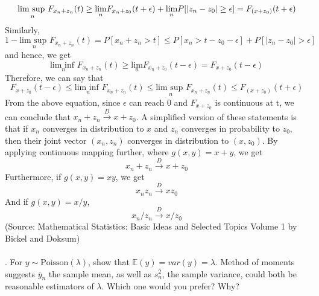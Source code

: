 \documentclass[11pt]{article}
\begin{document}
\begin{equation}
  \nonumber
  \underset{n}{\text{lim sup }}F_{x_{n} + z_{n}}(t) \geq \underset{n}{\text{lim}}F_{x_{n} + z_{0}}(t + \epsilon) + \underset{n}{\text{lim}}P[\lvert z_{n} - z_{0} \rvert \geq \epsilon] = F_{(x + z_{0})}(t + \epsilon)\\
\end{equation}Similarly,
\begin{equation}
  \nonumber
  1 - \underset{n}{\text{lim sup }}F_{x_{n} + z_{n}}(t) = P[x_{n} + z_{n} > t] \leq P[x_{n} > t - z_{0} -\epsilon] + P[\lvert z_{n} - z_{0} \rvert > \epsilon]
\end{equation}
and hence, we get
\begin{equation}
  \nonumber
  \underset{n}{\text{lim inf }}F_{x_{n} + z_{n}}(t) \geq \underset{n}{\text{lim}}F_{x_{n} + z_{0}}(t - \epsilon) = F_{x + z_{0}}(t - \epsilon)
\end{equation}
Therefore, we can say that
\begin{equation}
  \nonumber
  F_{x + z_{0}}(t - \epsilon) \leq \underset{n}{\text{lim inf }}F_{x_{n} + z_{n}}(t) \leq \underset{n}{\text{lim sup }}F_{x_{n} + z_{n}}(t) \leq F_{(x + z_{0})}(t + \epsilon)
\end{equation}
From the above equation, since $\epsilon$ can reach 0 and $F_{x + z_{0}}$ is continuous at t, we can conclude that $x_{n} + z_{n} \xrightarrow{D} x + z_{0}$. A simplified version of these statements is that if $x_{n}$ converges in distribution to $x$ and $z_{n}$ converges in probability to $z_{0}$, then their joint vector $(x_{n}, z_{n})$ converges in distribution to $(x, z_{0})$. By applying continuous mapping further, where $g(x, y) = x + y$, we get
\begin{equation}
  \nonumber
  x_{n} + z_{n} \xrightarrow{D} x + z_{0}
\end{equation}
Furthermore, if $g(x, y) = xy$, we get
\begin{equation}
  \nonumber
  x_{n}z_{n} \xrightarrow{D} xz_{0}
\end{equation}
And if $g(x, y) = x/y$,
\begin{equation}
  \nonumber
  x_{n}/z_{n} \xrightarrow{D} x/z_{0}
\end{equation}
(Source: Mathematical Statistics: Basic Ideas and Selected Topics Volume 1 by Bickel and Doksum)\\ \\
. For $y \sim \text{Poisson}(\lambda)$, show that $\mathbb{E}(y) = var(y) = \lambda$. Method of moments suggests $\bar y_{n}$ the sample mean, as well as $s_{n}^{2}$, the sample variance, could both be reasonable estimators of $\lambda$. Which one would you prefer? Why?\\ \\
\end{document}
